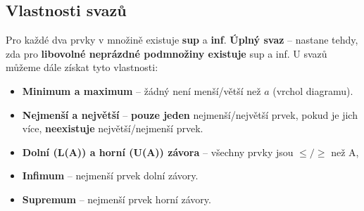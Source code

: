 \subsection{Vlastnosti svazů}
Pro každé dva prvky v množině existuje \textbf{sup} a \textbf{inf}. \textbf{Úplný svaz} -- nastane tehdy, zda pro \textbf{libovolné neprázdné podmnožiny existuje} sup a inf. U svazů můžeme dále získat tyto vlastnosti:
\begin{itemize}
    \item \textbf{Minimum a maximum} -- žádný není menší/větší než $a$ (vrchol diagramu).
    \item \textbf{Nejmenší a největší} -- \textbf{pouze jeden} nejmenší/největší prvek, pokud je jich více, \textbf{neexistuje} největší/nejmenší prvek.
    \item \textbf{Dolní (L(A)) a horní (U(A)) závora} -- všechny prvky jsou $\leq/\geq$ než A,
    \item \textbf{Infimum} -- nejmenší prvek dolní závory.
    \item \textbf{Supremum} -- nejmenší prvek horní závory.
\end{itemize}